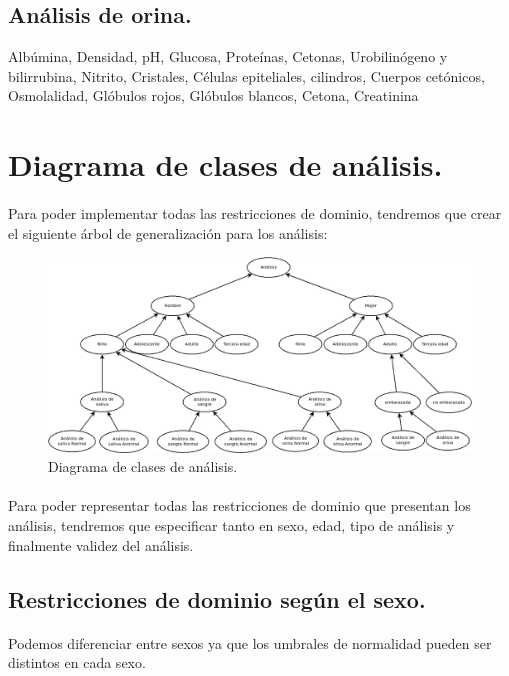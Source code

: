 \documentclass[a4paper,10pt]{article}
\begin{document}
\subsection{Análisis de orina.}
Albúmina, Densidad, pH, Glucosa, Proteínas, Cetonas, Urobilinógeno y bilirrubina, Nitrito, Cristales, Células epiteliales, cilindros, Cuerpos cetónicos, Osmolalidad, Glóbulos rojos, Glóbulos blancos, Cetona, Creatinina
\pagebreak

\section{Diagrama de clases de análisis.}
\paragraph{}
Para poder implementar todas las restricciones de dominio, tendremos que crear el siguiente árbol de generalización para los análisis:\\
\begin{figure}[hbt]
\includegraphics[width=\textwidth]{img/analisis.png}
\caption{Diagrama de clases de análisis.}
\label{fig:diagramaanalisis}
\end{figure}
\paragraph{}
Para poder representar todas las restricciones de dominio que presentan los análisis, tendremos que especificar tanto en sexo, edad, tipo de análisis y finalmente validez del análisis.
\subsection{Restricciones de dominio según el sexo.}
\paragraph{}
Podemos diferenciar entre sexos ya que los umbrales de normalidad pueden ser distintos en cada sexo.
\end{document}
